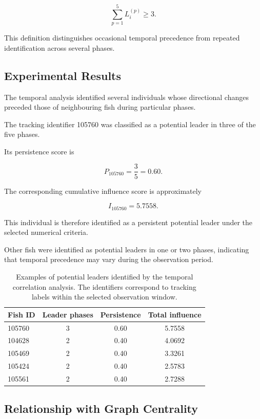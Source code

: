 \documentclass[10pt,a4paper]{article}
\begin{document}
\[
\sum_{p=1}^{5}
L_i^{(p)}
\geq 3.
\]

This definition distinguishes
occasional temporal
precedence from repeated
identification across
several phases.

\subsection{Experimental Results}

The temporal analysis
identified several
individuals whose
directional changes
preceded those of
neighbouring fish
during particular phases.

The tracking identifier
105760 was classified
as a potential leader
in three of the five phases.

Its persistence score is

\[
P_{105760}
=
\frac{3}{5}
=
0.60.
\]

The corresponding
cumulative influence
score is approximately

\[
I_{105760}
=
5.7558.
\]

This individual is
therefore identified
as a persistent potential
leader under the
selected numerical criteria.

Other fish were identified
as potential leaders
in one or two phases,
indicating that temporal
precedence may vary
during the observation period.

\begin{table}[htbp]
\centering
\small
\begin{tabular}{lccc}
\toprule
\textbf{Fish ID}
& \textbf{Leader phases}
& \textbf{Persistence}
& \textbf{Total influence}\\
\midrule
105760 & 3 & 0.60 & 5.7558\\
104628 & 2 & 0.40 & 4.0692\\
105469 & 2 & 0.40 & 3.3261\\
105424 & 2 & 0.40 & 2.5783\\
105561 & 2 & 0.40 & 2.7288\\
\bottomrule
\end{tabular}
\caption{
Examples of potential leaders identified
by the temporal correlation analysis.
The identifiers correspond to tracking
labels within the selected observation
window.
}
\label{tab:app-leadership}
\end{table}

\subsection{Relationship with Graph Centrality}
\end{document}
